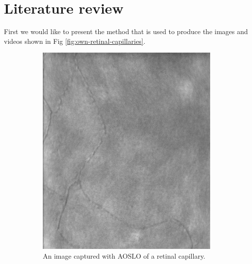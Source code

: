 \documentclass[]{article}
\begin{document}
\section{Literature review}
First we would like to present the method that is used to produce the images and videos shown in Fig \ref{fig:own-retinal-capillaries}. 

\begin{figure}
	\centering
	\begin{subfigure}[t]{0.45\textwidth}
		\centering
		\includegraphics[scale=0.3]{Subject3_Session216_OD_(0,0)_1x1_980_OA790nm_dewarped_first.jpg}
		\caption{An image captured with AOSLO of a retinal capillary.}
		\label{fig:eye-capillary}
	\end{subfigure}
	\hfill
	\centering
	\begin{subfigure}[t]{0.45\textwidth}
		\centering

\end{subfigure}
\end{figure}
\end{document}
